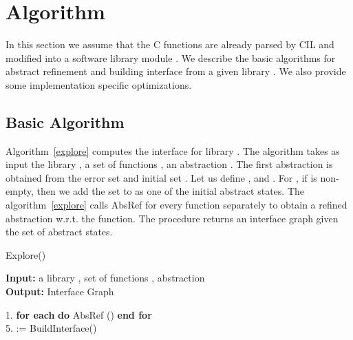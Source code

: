 \documentclass{llncs}
\begin{document}
\section{Algorithm}

In this section we assume that the C functions are already parsed by CIL and modified into a 
software library module .
We describe the basic algorithms for abstract refinement and building interface
from a given library .
We also provide some implementation specific optimizations. 
\subsection{Basic Algorithm}
 Algorithm~\ref{explore} computes the interface for library .
 The algorithm takes as input the library , a set of functions ,  an abstraction .
The first abstraction is obtained from the error set  and initial set  .
Let us define , 
 and .
For , if   is non-empty, then we add the set to  as one of the initial abstract states.
The algorithm~\ref{explore} calls AbsRef for every function  separately to obtain a refined abstraction  w.r.t. the function.
The procedure  returns an interface graph  given the set of abstract states. 

\begin{algorithm}
\caption{Explore()} \label{explore}
{\bf Input:}  a library , set of functions , abstraction \\
 {\bf Output:} Interface Graph  
 \vspace*{-1ex}
\begin{tabbing}
1.     
\= 
{\bf for each}  {\bf do}   AbsRef () {\bf end for}\\
5. \>    := BuildInterface()\\
\end{tabbing}
\vspace*{-3ex}
\end{algorithm}
\end{document}
